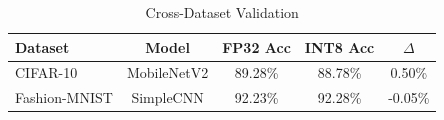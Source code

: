 \begin{table}[h]
\centering
\caption{Cross-Dataset Validation}
\label{tab:dataset_comparison}
\begin{tabular}{lcccc}
\hline
\textbf{Dataset} & \textbf{Model} & \textbf{FP32 Acc} & \textbf{INT8 Acc} & \textbf{$\Delta$} \\
\hline
CIFAR-10 & MobileNetV2 & 89.28\% & 88.78\% & 0.50\% \\
Fashion-MNIST & SimpleCNN & 92.23\% & 92.28\% & -0.05\% \\
\hline
\end{tabular}
\end{table}
